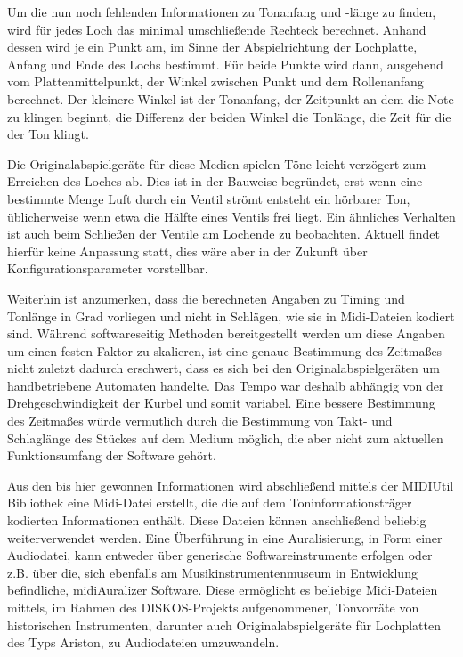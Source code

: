 Um die nun noch fehlenden Informationen zu Tonanfang und -länge zu finden, wird für jedes Loch das minimal umschließende Rechteck berechnet.
Anhand dessen wird je ein Punkt am, im Sinne der Abspielrichtung der Lochplatte, Anfang und Ende des Lochs bestimmt.
Für beide Punkte wird dann, ausgehend vom Plattenmittelpunkt, der Winkel zwischen Punkt und dem Rollenanfang berechnet.
Der kleinere Winkel ist der Tonanfang, der Zeitpunkt an dem die Note zu klingen beginnt, die Differenz der beiden Winkel die Tonlänge, die Zeit für die der Ton klingt.

Die Originalabspielgeräte für diese Medien spielen Töne leicht verzögert zum Erreichen des Loches ab.
Dies ist in der Bauweise begründet, erst wenn eine bestimmte Menge Luft durch ein Ventil strömt entsteht ein hörbarer Ton, üblicherweise wenn etwa die Hälfte eines Ventils frei liegt.
Ein ähnliches Verhalten ist auch beim Schließen der Ventile am Lochende zu beobachten.
Aktuell findet hierfür keine Anpassung statt, dies wäre aber in der Zukunft über Konfigurationsparameter vorstellbar.

Weiterhin ist anzumerken, dass die berechneten Angaben zu Timing und Tonlänge in Grad vorliegen und nicht in Schlägen, wie sie in Midi-Dateien kodiert sind.
Während softwareseitig Methoden bereitgestellt werden um diese Angaben um einen festen Faktor zu skalieren, ist eine genaue Bestimmung des Zeitmaßes nicht zuletzt dadurch erschwert, dass es sich bei den Originalabspielgeräten um handbetriebene Automaten handelte.
Das Tempo war deshalb abhängig von der Drehgeschwindigkeit der Kurbel und somit variabel.
Eine bessere Bestimmung des Zeitmaßes würde vermutlich durch die Bestimmung von Takt- und Schlaglänge des Stückes auf dem Medium möglich, die aber nicht zum aktuellen Funktionsumfang der Software gehört.

Aus den bis hier gewonnen Informationen wird abschließend mittels der MIDIUtil Bibliothek \parencite[]{midiutil} eine Midi-Datei erstellt, die die auf dem Toninformationsträger kodierten Informationen enthält.
Diese Dateien können anschließend beliebig weiterverwendet werden.
Eine Überführung in eine Auralisierung, in Form einer Audiodatei, kann entweder über generische Softwareinstrumente erfolgen oder z.B. über die, sich ebenfalls am Musikinstrumentenmuseum in Entwicklung befindliche, midiAuralizer \parencite[]{midiauralizer} Software.
Diese ermöglicht es beliebige Midi-Dateien mittels, im Rahmen des DISKOS-Projekts aufgenommener, Tonvorräte von historischen Instrumenten, darunter auch Originalabspielgeräte für Lochplatten des Typs Ariston, zu Audiodateien umzuwandeln.

